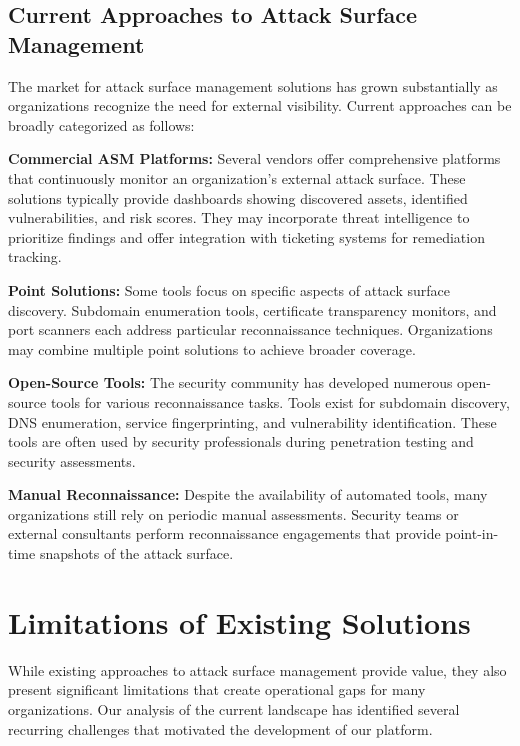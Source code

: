 \documentclass[a4paper,12pt]{report}
\begin{document}
\subsection{Current Approaches to Attack Surface Management}

The market for attack surface management solutions has grown substantially as organizations recognize the need for external visibility.\cite{asm_market} Current approaches can be broadly categorized as follows:\hfill \break

\textbf{Commercial ASM Platforms:} Several vendors offer comprehensive platforms that continuously monitor an organization's external attack surface. These solutions typically provide dashboards showing discovered assets, identified vulnerabilities, and risk scores. They may incorporate threat intelligence to prioritize findings and offer integration with ticketing systems for remediation tracking.\hfill \break

\textbf{Point Solutions:} Some tools focus on specific aspects of attack surface discovery. Subdomain enumeration tools, certificate transparency monitors, and port scanners each address particular reconnaissance techniques. Organizations may combine multiple point solutions to achieve broader coverage.\hfill \break

\textbf{Open-Source Tools:} The security community has developed numerous open-source tools for various reconnaissance tasks. Tools exist for subdomain discovery, DNS enumeration, service fingerprinting, and vulnerability identification. These tools are often used by security professionals during penetration testing and security assessments.\hfill \break

\textbf{Manual Reconnaissance:} Despite the availability of automated tools, many organizations still rely on periodic manual assessments. Security teams or external consultants perform reconnaissance engagements that provide point-in-time snapshots of the attack surface.\hfill \break

\section{Limitations of Existing Solutions}

While existing approaches to attack surface management provide value, they also present significant limitations that create operational gaps for many organizations. Our analysis of the current landscape has identified several recurring challenges that motivated the development of our platform.
\end{document}
